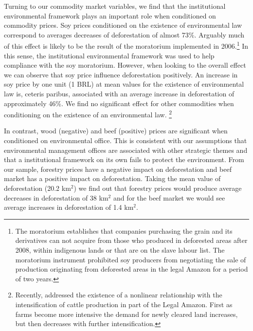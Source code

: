 Turning to our commodity market variables, we find that the institutional environmental framework plays an important role when conditioned on commodity prices. Soy prices conditioned on the existence of environmental law correspond to averages decreases of deforestation of almost 73\%. Arguably much of this effect is likely to be the result of the moratorium implemented in 2006.\footnote{The moratorium establishes that companies purchasing the grain and its derivatives can not acquire from those who produced in deforested areas after 2008, within indigenous lands or that are on the slave labour list. The moratorium instrument prohibited soy producers from negotiating the sale of production originating from deforested areas in the legal Amazon for a period of two years.}  In this sense, the institutional environmental framework was used to help compliance with the soy moratorium. However, when looking to the overall effect we can observe that soy price influence deforestation positively. An increase in soy price by one unit (1 BRL) at mean values for the existence of environmental law is, ceteris paribus, associated with an average increase in deforestation of approximately 46\%. We find no significant effect for other commodities when conditioning on the existence of an environmental law. \footnote{Recently, \citet{CAVIGLIAHARRIS2018232} addressed the existence of a nonlinear relationship with the intensification of cattle production in part of the Legal Amazon. First as farms become more intensive the demand for newly cleared land increases, but then decreases with further intensification.}

In contrast, wood (negative) and beef (positive) prices are significant when conditioned on environmental office. This is consistent with our assumptions that environmental management offices are associated with other strategic themes and that a institutional framework on its own fails to protect the environment. From our sample, forestry prices have a negative impact on deforestation and beef market has a positive impact on deforestation. Taking the mean value of deforestation (20.2 km$^{2}$) we find out that forestry prices would produce average decreases in deforestation of 38 km$^{2}$ and for the beef market we would see average increases in deforestation of 1.4 km$^{2}$.

